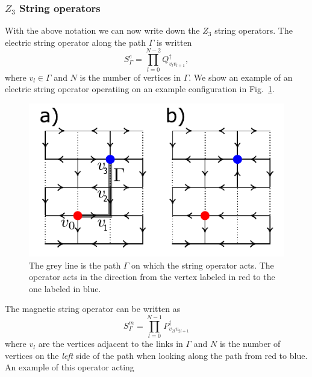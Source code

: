 \documentclass[twocolumn,prb,aps,floatfix,superscriptaddress]{revtex4-1}
\begin{document}
        \subsubsection{$Z_3$ String operators}
            With the above notation we can now write down the $Z_3$ string operators. The electric string operator along
            the path $\Gamma$ is written
            \begin{equation}
                S^e_{\Gamma} = \prod_{l=0}^{N-2} Q_{v_lv_{l+1}}^\dagger
                ,
            \end{equation}
            where $v_l \in \Gamma$ and $N$ is the number of vertices in $\Gamma$. We show an example of an
            electric string operator operatiing on an example configuration in Fig.~\ref{fig:example_elec_string}.
            \begin{figure}[htpb]
                \centering
                \includegraphics[width=0.8\linewidth]{example_elec_string.pdf}
                \caption{The grey line is the path $\Gamma$ on which the string operator acts. The operator acts
            in the direction from the vertex labeled in red to the one labeled in blue.}
                \label{fig:example_elec_string}
            \end{figure}
            The magnetic string operator can be written as
            \begin{equation}
                S^m_{\Gamma} = \prod_{l=0}^{N-1} P_{v_{2l}v_{2l+1}}^\dagger
            \end{equation}
            where $v_l$ are the vertices adjacent to the links in $\Gamma$ and $N$ is the number of
            vertices
            on the \textit{left} side of the path when looking along the path from red to blue. 
            An example of this operator acting
\end{document}
